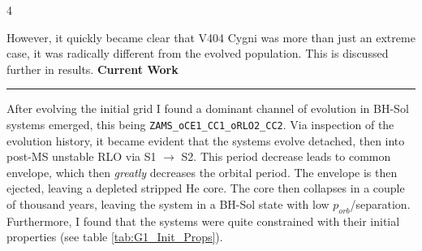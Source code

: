\documentclass{article}
\begin{document}
\begin{multicols}{4}
\begin{tcolorbox}[sectionbox={Methods}, breakable=true]
    However, it quickly became clear that V404 Cygni was more than just an extreme case, it was radically different from the evolved population. This is discussed further in results.  
  \textbf{Current Work}
  \vspace{.5cm}
  \hrule
  \vspace{.5cm} 
    After evolving the initial grid I found a dominant channel of evolution in BH-Sol systems emerged, this being \verb|ZAMS_oCE1_CC1_oRLO2_CC2|. Via inspection of the evolution history, it became evident that the systems evolve detached, then into post-MS unstable RLO via S1 \(\rightarrow\) S2. This period decrease leads to common envelope, which then \textit{greatly} decreases the orbital period. The envelope is then ejected, leaving a depleted stripped He core. The core then collapses in a couple of thousand years, leaving the system in a BH-Sol state with low \(p_{orb}\)/separation. Furthermore, I found that the systems were quite constrained with their initial properties (see table \ref{tab:G1_Init_Props}).


\end{tcolorbox}
\end{multicols}
\end{document}
